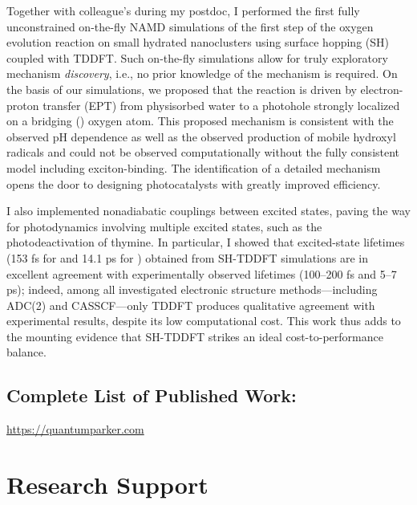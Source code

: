 \documentclass{nihbiosketch}
\begin{document}
\begin{enumerate}
\begin{bibunit}[nih]
  Together with colleague's during my postdoc, I performed the first fully unconstrained on-the-fly NAMD
  simulations of the first step of the oxygen evolution reaction on small hydrated  nanoclusters
  using surface hopping (SH) coupled with TDDFT.\cite{Muuronen2017ChemSci2179}
  Such on-the-fly simulations allow for truly exploratory mechanism \emph{discovery}, i.e., no
  prior knowledge of the mechanism is required. On the basis of our simulations, we proposed that the reaction is driven by
  electron-proton transfer (EPT) from physisorbed water to a photohole strongly localized on a bridging ()
  oxygen atom. This proposed mechanism is consistent with the observed pH dependence as well as the
  observed production of mobile hydroxyl radicals and could not be observed computationally without the fully consistent
  model including exciton-binding. The identification of a detailed mechanism opens the door to designing photocatalysts
  with greatly improved efficiency.

  I also implemented nonadiabatic couplings between excited states, paving the way for photodynamics
  involving multiple excited states, such as the photodeactivation of thymine.\cite{Parker2019}
  In particular, I showed that excited-state lifetimes (153 fs for  and 14.1 ps for ) obtained
  from SH-TDDFT simulations are in excellent agreement with experimentally observed lifetimes (100--200 fs and
  5--7 ps); indeed, among all investigated electronic structure methods---including ADC(2) and CASSCF---only TDDFT produces
  qualitative agreement with experimental results, despite its low computational cost.
  This work thus adds to the mounting evidence that SH-TDDFT strikes an ideal cost-to-performance balance.

  \renewcommand{\refname}{\vspace{-2em}}
  \end{bibunit}
\end{enumerate}

\subsection*{Complete List of Published Work:}
\url{https://quantumparker.com}


\section{Research Support}
\end{document}
